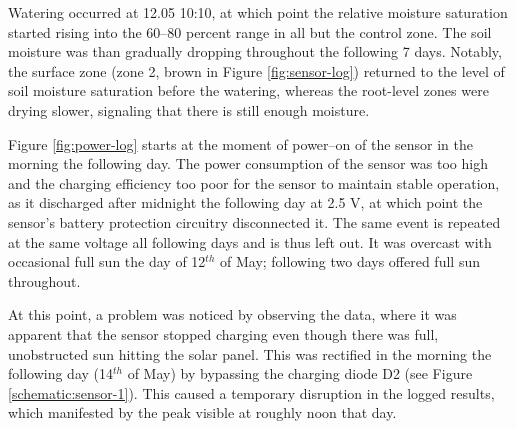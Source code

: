 Watering occurred at 12.05 10:10, at which point the relative moisture saturation started rising into the 60--80 percent range in all but the control zone. The soil moisture was than gradually dropping throughout the following 7 days. Notably, the surface zone (zone 2, brown in Figure \ref{fig:sensor-log}) returned to the level of soil moisture saturation before the watering, whereas the root-level zones were drying slower, signaling that there is still enough moisture.

Figure \ref{fig:power-log} starts at the moment of power--on of the sensor in the morning the following day. The power consumption of the sensor was too high and the charging efficiency too poor for the sensor to maintain stable operation, as it discharged after midnight the following day at 2.5 V, at which point the sensor's battery protection circuitry disconnected it. The same event is repeated at the same voltage all following days and is thus left out. It was overcast with occasional full sun the day of 12$^{th}$ of May; following two days offered full sun throughout.

At this point, a problem was noticed by observing the data, where it was apparent that the sensor stopped charging even though there was full, unobstructed sun hitting the solar panel. This was rectified in the morning the following day (14$^{th}$ of May) by bypassing the charging diode D2 (see Figure \ref{schematic:sensor-1}). This caused a temporary disruption in the logged results, which manifested by the peak visible at roughly noon that day.

